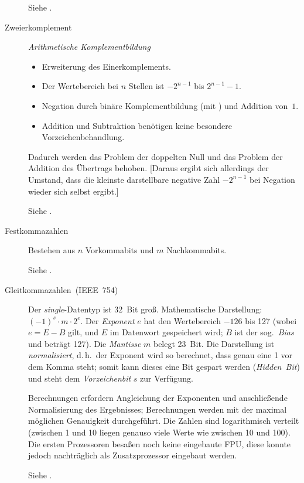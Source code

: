 \begin{description}
	Siehe \cite{wiki:Einerkomplement}.

  \item [{Zweierkomplement}] 
	\emph{Arithmetische Komplementbildung}

	\begin{itemize}
	  \item Erweiterung des Einerkomplements.
	  \item Der Wertebereich bei $n$ Stellen ist $-2^{n-1}$ bis $2^{n-1}-1$.
	  \item Negation durch binäre Komplementbildung (mit ) und Addition von~$1$.
	  \item Addition und Subtraktion benötigen keine besondere Vorzeichenbehandlung.
	\end{itemize}

	Dadurch werden das Problem der doppelten Null und das Problem der Addition des Übertrags behoben.
	[Daraus ergibt sich allerdings der Umstand, dass die kleinste darstellbare negative Zahl $-2^{n-1}$ bei Negation wieder sich selbst ergibt.]

	Siehe \cite{wiki:Zweierkomplement}.

  \item [{Festkommazahlen}] 
	Bestehen aus $n$ Vorkommabits und $m$ Nachkommabits.

	Siehe \cite{wiki:Festkommazahl}.

  \item [{Gleitkommazahlen~(IEEE~754)}] \label{Gleitkommazahlen(IEEE754)}

	Der \mbox{\emph{single}}-Datentyp ist 32~Bit groß.
	Mathematische Darstellung: $(-1)^s \cdot m\cdot2^e$.
	Der \emph{Exponent} $e$ hat den Wertebereich $-126$ bis 127 (wobei $e=E-B$ gilt, und $E$ im Datenwort gespeichert wird; $B$ ist der sog.~\emph{Bias} und beträgt 127).
	Die \emph{Mantisse} $m$ belegt 23~Bit.
	Die Darstellung ist \emph{normalisiert}, d.\,h.~der Exponent wird so berechnet, dass genau eine 1 vor dem Komma steht; somit kann dieses eine Bit gespart werden (\mbox{\emph{Hidden Bit}}) und steht dem \emph{Vorzeichenbit} $s$ zur Verfügung.

	Berechnungen erfordern Angleichung der Exponenten und anschließende Normalisierung des Ergebnisses; Berechnungen werden mit der maximal möglichen Genauigkeit durchgeführt.
	Die Zahlen sind logarithmisch verteilt (zwischen 1 und 10 liegen genauso viele Werte wie zwischen 10 und 100).
	Die ersten Prozessoren besaßen noch keine eingebaute FPU, diese konnte jedoch nachträglich als Zusatzprozessor eingebaut werden.

	Siehe \cite{wiki:IEEE754,wiki:Gleitkommazahl}.

\end{description}

